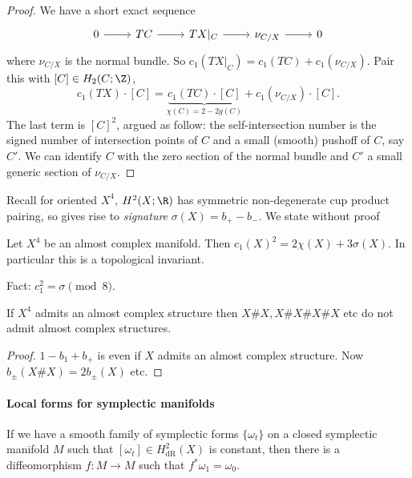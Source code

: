 \documentclass[a4paper]{article}
\begin{document}
\begin{proof}
  We have a short exact sequence
  \[
    \begin{tikzcd}
      0 \ar[r] & TC \ar[r] & TX|_C \ar[r] & \nu_{C/X} \ar[r] & 0
    \end{tikzcd}
  \]
  where \(\nu_{C/X}\) is the normal bundle. So \(c_1(TX|_C) = c_1(TC) + c_1(\nu_{C/X})\). Pair this with \([C] \in H_2(C; \Z)\),
  \[
    c_1(TX) \cdot [C] = \underbrace{c_1(TC) \cdot [C]}_{\chi(C) = 2 - 2g(C)} + c_1(\nu_{C/X}) \cdot [C].
  \]
  The last term is \([C]^2\), argued as follow: the self-intersection number is the signed number of intersection points of \(C\) and a small (smooth) pushoff of \(C\), say \(C'\). We can identify \(C\) with the zero section of the normal bundle and \(C'\) a small generic section of \(\nu_{C/X}\).
\end{proof}

Recall for oriented \(X^4\), \(H^2(X; \R)\) has symmetric non-degenerate cup product pairing, so gives rise to \emph{signature} \(\sigma(X) = b_+ - b_-\). We state without proof

\begin{theorem}
  Let \(X^4\) be an almost complex manifold. Then \(c_1(X)^2 = 2 \chi(X) + 3\sigma(X)\). In particular this is a topological invariant.
\end{theorem}

Fact: \(c_1^2 = \sigma \pmod 8\).

\begin{corollary}
  If \(X^4\) admits an almost complex structure then \(X \# X, X \# X \# X \# X\) etc do not admit almost complex structures.
\end{corollary}

\begin{proof}
  \(1 - b_1 + b_+\) is even if \(X\) admits an almost complex structure. Now \(b_\pm(X \# X) = 2 b_\pm(X)\) etc.
\end{proof}


\paragraph{Local forms for symplectic manifolds}

\begin{theorem}
  If we have a smooth family of symplectic forms \(\{\omega_t\}\) on a closed symplectic manifold \(M\) such that \([\omega_t] \in H^2_{\mathrm{dR}}(X)\) is constant, then there is a diffeomorphism \(f: M \to M\) such that \(f^*\omega_1 = \omega_0\).
\end{theorem}
\end{document}
